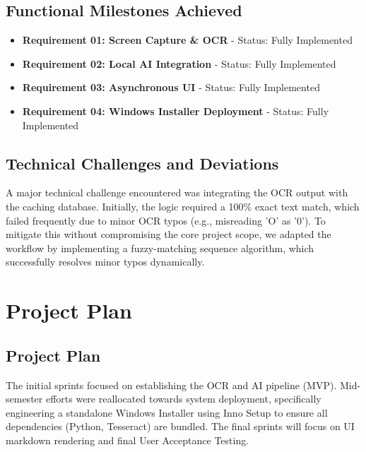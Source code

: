 \documentclass[12pt,a4paper]{report}
\begin{document}
\section{Functional Milestones Achieved}
\begin{itemize}
    \item \textbf{Requirement 01: Screen Capture \& OCR} - Status: Fully Implemented
    \item \textbf{Requirement 02: Local AI Integration} - Status: Fully Implemented
    \item \textbf{Requirement 03: Asynchronous UI} - Status: Fully Implemented
    \item \textbf{Requirement 04: Windows Installer Deployment} - Status: Fully Implemented
\end{itemize}

\section{Technical Challenges and Deviations}
A major technical challenge encountered was integrating the OCR output with the caching database. Initially, the logic required a 100\% exact text match, which failed frequently due to minor OCR typos (e.g., misreading 'O' as '0'). To mitigate this without compromising the core project scope, we adapted the workflow by implementing a fuzzy-matching sequence algorithm, which successfully resolves minor typos dynamically.

\chapter{Project Plan}

\section{Project Plan}
The initial sprints focused on establishing the OCR and AI pipeline (MVP). Mid-semester efforts were reallocated towards system deployment, specifically engineering a standalone Windows Installer using Inno Setup to ensure all dependencies (Python, Tesseract) are bundled. The final sprints will focus on UI markdown rendering and final User Acceptance Testing.
\end{document}
